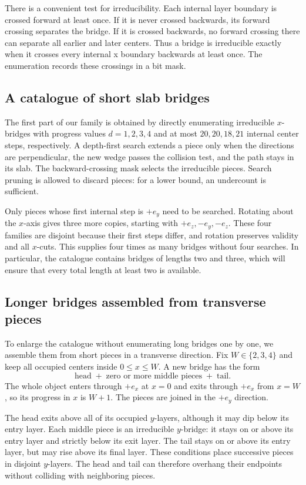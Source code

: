 \documentclass[11pt]{article}
\begin{document}
There is a convenient test for irreducibility. Each internal layer
boundary is crossed forward at least once. If it is never crossed
backwards, its forward crossing separates the bridge. If it is
crossed backwards, no forward crossing there can separate all earlier
and later centers. Thus a bridge is irreducible exactly when it
crosses every internal x boundary backwards at least once.
The enumeration records these crossings in a bit mask.

\subsection{A catalogue of short slab bridges}

The first part of our family is obtained by directly enumerating
irreducible $x$-bridges with progress values $d=1,2,3,4$ and at most
$20,20,18,21$ internal center steps, respectively. A depth-first
search extends a piece only when the directions are perpendicular,
the new wedge passes the collision test, and the path stays in its
slab. The backward-crossing mask selects the irreducible pieces.
Search pruning is allowed to discard pieces: for a lower bound,
an undercount is sufficient.

Only pieces whose first internal step is $+e_y$ need to be searched.
Rotating about the $x$-axis gives three more copies, starting with
$+e_z,-e_y,-e_z$. These four families are disjoint because their
first steps differ, and rotation preserves validity and all $x$-cuts.
This supplies four times as many bridges without four searches.
In particular, the catalogue contains bridges of lengths two and
three, which will ensure that every total length at least two is
available.

\subsection{Longer bridges assembled from transverse pieces}

To enlarge the catalogue without enumerating long bridges one by
one, we assemble them from short pieces in a transverse direction.
Fix $W\in\{2,3,4\}$ and keep all occupied centers inside
$0\leq x\leq W$. A new bridge has the form
\[
 \text{head}\;+\;\text{zero or more middle pieces}\;+\;\text{tail}.
\]
The whole object enters through $+e_x$ at $x=0$ and exits through
$+e_x$ from $x=W$, so its progress in $x$ is $W+1$.
The pieces are joined in the $+e_y$ direction.

The head exits above all of its occupied $y$-layers, although it may
dip below its entry layer. Each middle piece is an irreducible
$y$-bridge: it stays on or above its entry layer and strictly below
its exit layer. The tail stays on or above its entry layer, but may
rise above its final layer. These conditions place successive
pieces in disjoint $y$-layers. The head and tail can therefore
overhang their endpoints without colliding with neighboring pieces.
\end{document}
